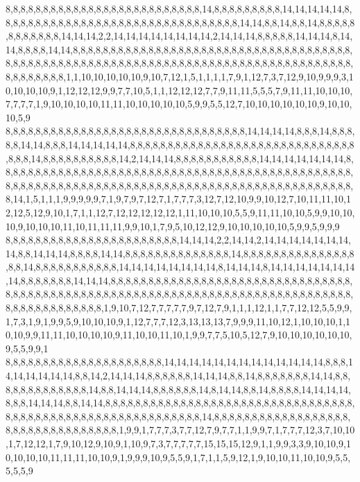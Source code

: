 8,8,8,8,8,8,8,8,8,8,8,8,8,8,8,8,8,8,8,8,8,8,8,8,8,8,14,8,8,8,8,8,8,8,8,8,14,14,14,14,14,8,8,8,8,8,8,8,8,8,8,8,8,8,8,8,8,8,8,8,8,8,8,8,8,8,8,8,8,8,8,8,8,14,14,8,8,14,8,8,14,8,8,8,8,8,8,8,8,8,8,8,8,14,14,14,2,2,14,14,14,14,14,14,14,14,2,14,14,14,8,8,8,8,8,14,14,14,8,14,14,8,8,8,8,14,14,8,8,8,8,8,8,8,8,8,8,8,8,8,8,8,8,8,8,8,8,8,8,8,8,8,8,8,8,8,8,8,8,8,8,8,8,8,8,8,8,8,8,8,8,8,8,8,8,8,8,8,8,8,8,8,8,8,8,8,8,8,8,8,8,8,8,8,8,8,8,8,8,8,8,8,8,8,8,8,8,8,8,8,8,8,8,8,8,8,8,8,1,1,10,10,10,10,10,9,10,7,12,1,5,1,1,1,1,7,9,1,12,7,3,7,12,9,10,9,9,9,3,10,10,10,10,9,1,12,12,12,9,9,7,7,10,5,1,1,12,12,12,7,7,9,11,11,5,5,5,7,9,11,11,10,10,10,7,7,7,7,1,9,10,10,10,10,11,11,10,10,10,10,10,5,9,9,5,5,12,7,10,10,10,10,10,10,9,10,10,10,5,9
8,8,8,8,8,8,8,8,8,8,8,8,8,8,8,8,8,8,8,8,8,8,8,8,8,8,8,8,8,8,8,8,14,14,14,14,8,8,8,14,8,8,8,8,8,14,14,8,8,8,14,14,14,14,14,8,8,8,8,8,8,8,8,8,8,8,8,8,8,8,8,8,8,8,8,8,8,8,8,8,8,8,8,8,8,8,8,8,14,8,8,8,8,8,8,8,8,8,8,14,2,14,14,14,8,8,8,8,8,8,8,8,8,8,8,14,14,14,14,14,14,14,8,8,8,8,8,8,8,8,8,8,8,8,8,8,8,8,8,8,8,8,8,8,8,8,8,8,8,8,8,8,8,8,8,8,8,8,8,8,8,8,8,8,8,8,8,8,8,8,8,8,8,8,8,8,8,8,8,8,8,8,8,8,8,8,8,8,8,8,8,8,8,8,8,8,8,8,8,8,8,8,8,8,8,8,8,8,8,8,8,8,8,8,8,8,14,1,5,1,1,1,9,9,9,9,9,7,1,9,7,9,7,12,7,1,7,7,7,3,12,7,12,10,9,9,10,12,7,10,11,11,10,12,12,5,12,9,10,1,7,1,1,12,7,12,12,12,12,12,1,11,10,10,10,5,5,9,11,11,10,10,5,9,9,10,10,10,9,10,10,10,11,10,11,11,11,9,9,10,1,7,9,5,10,12,12,9,10,10,10,10,10,5,9,9,5,9,9,9
8,8,8,8,8,8,8,8,8,8,8,8,8,8,8,8,8,8,8,8,8,8,8,14,14,14,2,2,14,14,2,14,14,14,14,14,14,14,14,8,8,14,14,14,8,8,8,8,14,14,8,8,8,8,8,8,8,8,8,8,8,8,8,8,14,8,8,8,8,8,8,8,8,8,8,8,8,8,8,8,8,8,14,8,8,8,8,8,8,8,8,8,8,8,14,14,14,14,14,14,14,14,8,14,14,14,8,14,14,14,14,14,14,14,14,8,8,8,8,8,8,8,14,14,14,8,8,8,8,8,8,8,8,8,8,8,8,8,8,8,8,8,8,8,8,8,8,8,8,8,8,8,8,8,8,8,8,8,8,8,8,8,8,8,8,8,8,8,8,8,8,8,8,8,8,8,8,8,8,8,8,8,8,8,8,8,8,8,8,8,8,8,8,8,8,8,8,8,8,8,8,8,8,8,8,8,8,8,8,8,8,8,8,8,8,8,1,9,10,7,12,7,7,7,7,7,9,7,12,7,9,1,1,1,12,1,1,7,7,12,12,5,5,9,9,1,7,3,1,9,1,9,9,5,9,10,10,10,9,1,12,7,7,7,12,3,13,13,13,7,9,9,9,11,10,12,1,10,10,10,1,10,10,9,9,11,11,10,10,10,10,9,11,10,10,11,10,1,9,9,7,7,5,10,5,12,7,9,10,10,10,10,10,10,9,5,5,9,9,1
8,8,8,8,8,8,8,8,8,8,8,8,8,8,8,8,8,8,8,8,8,14,14,14,14,14,14,14,14,14,14,14,14,14,8,8,8,14,14,14,14,14,14,8,8,14,2,14,14,14,8,8,8,8,8,8,14,14,14,8,8,14,8,8,8,8,8,8,8,14,14,8,8,8,8,8,8,8,8,8,8,8,8,8,14,8,8,14,14,14,8,8,8,8,8,8,14,8,14,14,8,8,14,8,8,8,8,14,14,14,14,8,8,8,14,14,14,8,8,14,14,8,8,8,8,8,8,8,8,8,8,8,8,8,8,8,8,8,8,8,8,8,8,8,8,8,8,8,8,8,8,8,8,8,8,8,8,8,8,8,8,8,8,8,8,8,8,8,8,8,8,8,8,8,8,8,8,8,8,8,14,8,8,8,8,8,8,8,8,8,8,8,8,8,8,8,8,8,8,8,8,8,8,8,8,8,8,8,8,8,8,8,8,8,1,9,9,1,7,7,7,3,7,7,12,7,9,7,7,1,1,9,9,7,1,7,7,7,12,3,7,10,10,1,7,12,12,1,7,9,10,12,9,10,9,1,10,9,7,3,7,7,7,7,7,15,15,15,12,9,1,1,9,9,3,3,9,10,10,9,10,10,10,10,11,11,11,10,10,9,1,9,9,9,10,9,5,5,9,1,7,1,1,5,9,12,1,9,10,10,11,10,10,9,5,5,5,5,5,9
